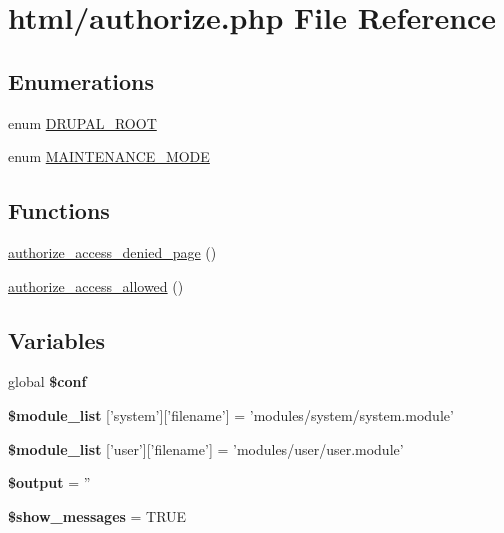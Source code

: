 \hypertarget{authorize_8php}{
\section{html/authorize.php File Reference}
\label{authorize_8php}
}
\subsection*{Enumerations}
\begin{DoxyCompactItemize}
\item 
enum \hyperlink{authorize_8php_a21cf187d162beffb1fbc5a1d1098f4f9}{DRUPAL\_\-ROOT} 
\item 
enum \hyperlink{authorize_8php_a5bf6dfe9ba7ee16c648e3932aa76535d}{MAINTENANCE\_\-MODE} 
\end{DoxyCompactItemize}
\subsection*{Functions}
\begin{DoxyCompactItemize}
\item 
\hyperlink{authorize_8php_a4efdfa86d88a6a411a42e86d322dacc8}{authorize\_\-access\_\-denied\_\-page} ()
\item 
\hyperlink{authorize_8php_a6c899eb6e61092e6ee83d40deccd8127}{authorize\_\-access\_\-allowed} ()
\end{DoxyCompactItemize}
\subsection*{Variables}
\begin{DoxyCompactItemize}
\item 
\hypertarget{authorize_8php_a10064a52f624358ea93475105245c4ac}{
global {\bfseries \$conf}}
\label{authorize_8php_a10064a52f624358ea93475105245c4ac}

\item 
\hypertarget{authorize_8php_acf0330c113447a7ab0d77159f9370222}{
{\bfseries \$module\_\-list} \mbox{[}'system'\mbox{]}\mbox{[}'filename'\mbox{]} = 'modules/system/system.module'}
\label{authorize_8php_acf0330c113447a7ab0d77159f9370222}

\item 
\hypertarget{authorize_8php_aa34579efb4a994ca4798caaacabeb196}{
{\bfseries \$module\_\-list} \mbox{[}'user'\mbox{]}\mbox{[}'filename'\mbox{]} = 'modules/user/user.module'}
\label{authorize_8php_aa34579efb4a994ca4798caaacabeb196}

\item 
\hypertarget{authorize_8php_a73004ce9cd673c1bfafd1dc351134797}{
{\bfseries \$output} = ''}
\label{authorize_8php_a73004ce9cd673c1bfafd1dc351134797}

\item 
\hypertarget{authorize_8php_a76043d3ced665dfb748f144b23591c81}{
{\bfseries \$show\_\-messages} = TRUE}
\label{authorize_8php_a76043d3ced665dfb748f144b23591c81}

\end{DoxyCompactItemize}


